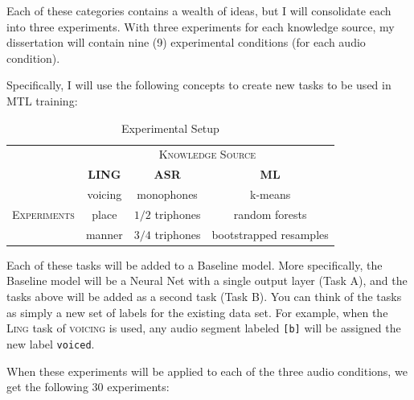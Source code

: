 \documentclass[10pt,a4paper]{article}
\begin{document}
Each of these categories contains a wealth of ideas, but I will consolidate each into three experiments. With three experiments for each knowledge source, my dissertation will contain nine (9) experimental conditions (for each audio condition).

Specifically, I will use the following concepts to create new tasks to be used in MTL training:

\begin{table}[!htbp]
  \centering
  \begin{adjustbox}{width=.55\textwidth}
    \begin{tabular}{cccc}
      \toprule
      & \multicolumn{3}{c}{\textsc{Knowledge Source}}\\
      & \textbf{LING} & \textbf{ASR} & \textbf{ML}\\
      \midrule
      \multirow{3}{*}{\textsc{Experiments}} & voicing & monophones &  k-means \\
      & place & $1/2$ triphones & random forests  \\
      & manner & $3/4$ triphones &  bootstrapped resamples  \\
      \bottomrule
    \end{tabular}
    \label{table:data}
  \end{adjustbox}
  
  \caption{Experimental Setup}
  
\end{table}


Each of these tasks will be added to a Baseline model. More specifically, the Baseline model will be a Neural Net with a single output layer (Task A), and the tasks above will be added as a second task (Task B). You can think of the tasks as simply a new set of labels for the existing data set. For example, when the \textsc{Ling} task of \textsc{voicing} is used, any audio segment labeled \texttt{[b]} will be assigned the new label \texttt{voiced}.

When these experiments will be applied to each of the three audio conditions, we get the following 30 experiments:
\end{document}
